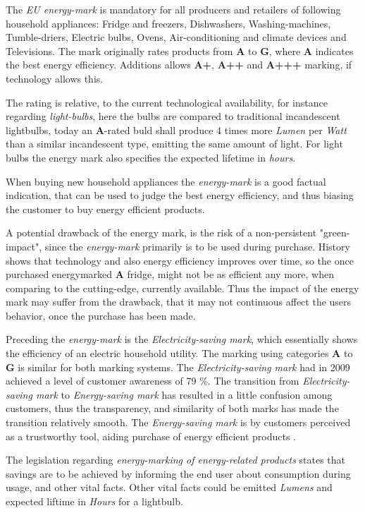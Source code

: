 \documentclass[journal]{IEEEtran}
\begin{document}
The \textit{EU energy-mark} is mandatory for all producers and retailers of following household appliances: 
Fridge and freezers, Dishwashers, Washing-machines, Tumble-driers, Electric bulbs, Ovens, 
Air-conditioning and climate devices and Televisions.
The mark originally rates products from \textbf{A} to \textbf{G}, where \textbf{A} indicates the best energy efficiency. 
Additions allows \textbf{A+}, \textbf{A++} and \textbf{A+++} marking, if technology allows this. \cite{energymark}

The rating is relative, to the current technological availability, for instance regarding \textit{light-bulbs}, 
here the bulbs are compared to traditional incandescent lightbulbs, today an \textbf{A}-rated buld shall produce 4 times more \textit{Lumen} per \textit{Watt} than a similar incandescent type, emitting the same amount of light. For light  bulbs the energy mark also specifies the expected lifetime in \textit{hours}.

When buying new household appliances the \textit{energy-mark} is a good factual indication, that can be used to judge the
best energy efficiency, and thus biasing the customer to buy energy efficient products. 

A potential drawback of the energy mark, is the risk of a non-persistent "green-impact", since the \textit{energy-mark} 
primarily is to be used during purchase. History shows that technology and also energy efficiency improves over time, so the once purchased energymarked \textbf{A} fridge, might not be as efficient any more, when comparing to the cutting-edge, currently available. Thus the impact of the energy mark may suffer from the drawback, that it may not continuous affect the users behavior, once the purchase has been made.  

Preceding the \textit{energy-mark} is the \textit{Electricity-saving mark}, which essentially shows the efficiency of an electric household utility. The marking using categories \textbf{A} to \textbf{G} is similar for both marking systems. 
The \textit{Electricity-saving mark} had in 2009 achieved a level of customer awareness of 79 \%. The transition from \textit{Electricity-saving mark} to \textit{Energy-saving mark} has resulted in a little confusion among customers, thus the transparency, and similarity of both marks has made the transition relatively smooth. 
The \textit{Energy-saving mark} is by customers perceived as a trustworthy tool, aiding purchase of energy efficient products \cite{annual_ens_10}.

The legislation regarding \textit{energy-marking of energy-related products} states that savings are to be achieved by informing the end user about consumption during usage, and other vital facts. \cite{energylaw1} Other vital facts could be emitted \textit{Lumens} and expected liftime in \textit{Hours} for a lightbulb.\newline 
\end{document}
